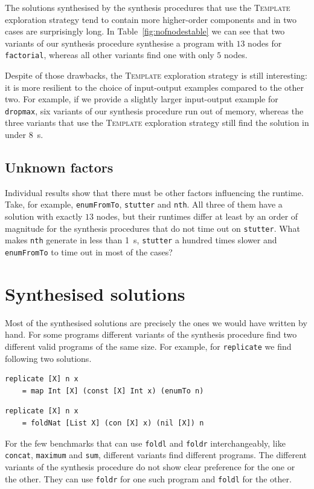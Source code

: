 The solutions synthesised by the synthesis procedures that use the \textsc{Template} exploration strategy tend to contain more higher-order components and in two cases are surprisingly long. In Table~\ref{fig:nofnodestable} we can see that two variants of our synthesis procedure synthesise a program with $13$ nodes for \lstinline?factorial?, whereas all other variants find one with only $5$ nodes.

Despite of those drawbacks, the \textsc{Template} exploration strategy is still interesting: it is more resilient to the choice of input-output examples compared to the other two. For example, if we provide a slightly larger input-output example for \lstinline?dropmax?, six variants of our synthesis procedure run out of memory, whereas the three variants that use the \textsc{Template} exploration strategy still find the solution in under \SI{8}{s}.

\subsection{Unknown factors}
Individual results show that there must be other factors influencing the runtime. Take, for example, \lstinline?enumFromTo?, \lstinline?stutter? and \lstinline?nth?. All three of them have a solution with exactly $13$ nodes, but their runtimes differ at least by an order of magnitude for the synthesis procedures that do not time out on \lstinline?stutter?. What makes \lstinline?nth? generate in less than \SI{1}{s}, \lstinline?stutter? a hundred times slower and \lstinline?enumFromTo? to time out in most of the cases?

\section{Synthesised solutions}
Most of the synthesised solutions are precisely the ones we would have written by hand. For some programs different variants of the synthesis procedure find two different valid programs of the same size. For example, for \lstinline?replicate? we find following two solutions.
\begin{lstlisting}
replicate [X] n x
    = map Int [X] (const [X] Int x) (enumTo n)
\end{lstlisting}
\begin{lstlisting}
replicate [X] n x
    = foldNat [List X] (con [X] x) (nil [X]) n
\end{lstlisting}

For the few benchmarks that can use \lstinline?foldl? and \lstinline?foldr? interchangeably, like \lstinline?concat?, \lstinline?maximum? and \lstinline?sum?, different variants find different programs. The different variants of the synthesis procedure do not show clear preference for the one or the other. They can use \lstinline?foldr? for one such program and \lstinline?foldl? for the other.

